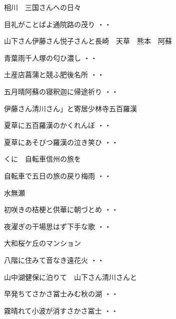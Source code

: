 相川　三国さんへの日々
\begin{shiika}目礼がことばよ通院路の茂り
\hfill{・・}\end{shiika}
\vspace{ 0.4cm}
山下さん伊藤さん悦子さんと長崎　天草　熊本　阿蘇
\begin{shiika}青葉雨千人塚の匂ひ濃し
\hfill{・・}\end{shiika}
\begin{shiika}土産店菖蒲と競ふ肥後名所
\hfill{・・}\end{shiika}
\begin{shiika}五月晴阿蘇の寝釈迦に帰途祈り
\hfill{・・}\end{shiika}
\vspace{ 0.4cm}
伊藤さん清川さん」と寄居少林寺五百羅漢
\begin{shiika}夏草に五百羅漢のかくれんぼ
\hfill{・・}\end{shiika}
\begin{shiika}夏草にあそびつ羅漢の泣き笑ひ
\hfill{・・}\end{shiika}
\vspace{ 0.4cm}
くに　自転車信州の旅を
\begin{shiika}自転車で五日の旅の戻り梅雨
\hfill{・・}\end{shiika}
\vspace{ 0.4cm}
水無瀬
\begin{shiika}初咲きの桔梗と供華に朝づとめ
\hfill{・・}\end{shiika}
\begin{shiika}夜濯ぎの干場思はず下手な歌
\hfill{・・}\end{shiika}
\vspace{ 0.4cm}
大和桜ケ丘のマンション
\begin{shiika}八階に住みて音なき遠花火
\hfill{・・}\end{shiika}
\vspace{ 0.4cm}
山中湖健保に泊りて　山下さん清川さんと
\begin{shiika}早発ちてさかさ冨士みむ秋の湖
\hfill{・・}\end{shiika}
\begin{shiika}霧晴れて小波が消すさかさ冨士
\hfill{・・}\end{shiika}

